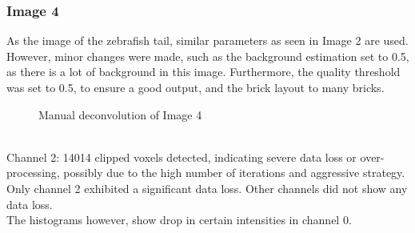\documentclass{article}
\begin{document}
\subsubsection*{Image 4}
As the image of the zebrafish tail, similar parameters as seen in Image 2 are used. However, minor changes were made, such as the background estimation set to 0.5, as there is a lot of background in this image. Furthermore, the quality threshold was set to 0.5, to ensure a good output, and the brick layout to many bricks.  \newline
\begin{figure}[h!]
\centering
{}
\vspace{5 mm}
\caption{Manual deconvolution of Image 4}
\label{fig:manual-deconvolve-image4}
\end{figure}
\\ 
Channel 2: 14014 clipped voxels detected, indicating severe data loss or over-processing, possibly due to the high number of iterations and aggressive strategy.\\ Only channel 2 exhibited a significant data loss. Other channels did not show any data loss. \\The histograms however, show drop in certain intensities in channel 0. 
\end{document}
